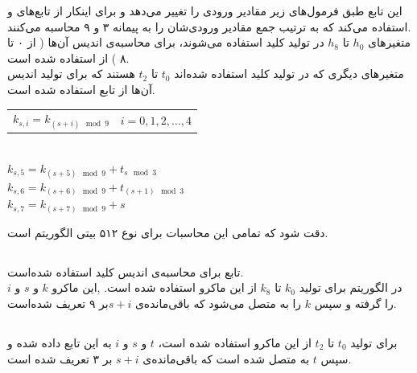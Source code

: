 این تابع طبق فرمول‌های زیر مقادیر ورودی را تغییر می‌دهد و برای اینکار از تابع‌های \hyperref[subsec:SKBI]{} و \hyperref[subsec:SKBT]{} استفاده می‌کند که به ترتیب جمع مقادیر ورودی‌شان را به پیمانه ۳ و ۹ محاسبه می‌کنند.
\\متغیرهای $ h_0 $ تا $ h_8 $ در تولید کلید استفاده می‌شوند، برای محاسبه‌ی اندیس آن‌ها ( از ۰ تا ۸ ) از  استفاده شده است.
\\
متغیر‌های دیگری که در تولید کلید استفاده شده‌اند $ t_0 $ تا $ t_2 $ هستند که برای تولید اندیس آن‌ها از تابع  استفاده شده است.\\
\begin{latin}
	\begin{center}
		\begin{tabular}{c c}
			$k_{s, i} = k_{(s+i) \mod 9} $ \hspace{15mm} & $  i = 0, 1, 2, ... , 4 $ \\
			
			
		\end{tabular}
		\\
		$k_{s, 5} = k_{(s+5) \mod 9} + t_{s \mod 3}$ \\
		$k_{s, 6} = k_{(s+6) \mod 9} + t_{(s+1) \mod 3}$ \\
		$k_{s, 7} = k_{(s+7) \mod 9} + s $\\	
	\end{center}
\end{latin}

دقت شود که تمامی این محاسبات برای نوع ۵۱۲ بیتی الگوریتم است.




\subsection{}
\label{subsec:SKBI}

تابع  برای محاسبه‌ی اندیس کلید استفاده‌ شده‌است. \\ 
در الگوریتم برای تولید $k_0 $ تا $ k_8 $ از این ماکرو استفاده شده ‌است.  ,این ماکرو $ k $ و $ s $ و $ i $ را گرفته و سپس $ k $ را به متصل می‌شود که باقی‌مانده‌ی ‌$s + i $بر ۹ تعریف شده‌است.


\subsection{}
\label{subsec:SKBT}
برای تولید $ t_0 $ تا $ t_2 $ از این ماکرو استفاده شده است، $ t $ و $ s $ و ‌$ i $ به این تابع داده شده و سپس $ t $ به  متصل شده است که باقی‌مانده‌ی $ s + i $ بر ۳ تعریف شده است.

